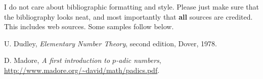 \documentclass[12pt, leqno]{article}
\begin{document}
I do not care about bibliographic formatting and style. Please just make sure that the bibliography looks neat, and most importantly
that {\bf all} sources are credited. This includes web sources. Some samples follow below.


\begin{thebibliography}{10000}

 U. Dudley,
{\itshape Elementary Number Theory},
second edition, Dover, 1978.

 D. Madore,
{\itshape A first introduction to $p$-adic numbers},
\url{http://www.madore.org/~david/math/padics.pdf}.

\end{thebibliography}
\end{document}
